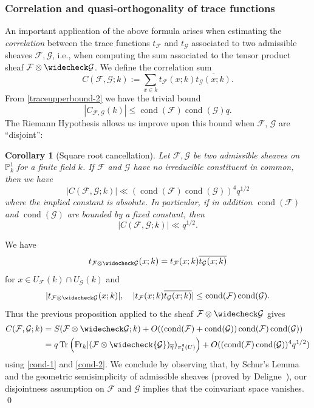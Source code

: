 \documentclass[12pt,a4paper,reqno]{amsart}
\numberwithin{equation}{section}
\DeclareMathOperator*\cond{cond}
\theoremstyle{plain}
\newtheorem{corollary}[theorem]{Corollary}
\theoremstyle{definition}
\newcommand\Fr{\mathrm{Fr}}
\newcommand\ov{\overline}
\newcommand\wcheck{\widecheck}
\newcommand\mcF{\mathcal{F}}
\newcommand\mcG{\mathcal{G}}
\newcommand\Pl{\mathbb{P}^1}
\DeclareMathOperator{\Tr}{Tr}
\begin{document}
\subsubsection{Correlation and quasi-orthogonality of trace functions}
An important application of the above formula arises when estimating
the \emph{correlation} between the trace functions $t_\mcF$ and
$t_\mcG$ associated to two admissible sheaves $\mcF, \mcG$, i.e., when
computing the sum associated to the tensor product sheaf
$\mcF\otimes\wcheck\mcG$.  
We define the correlation sum
$$
C(\mcF,\mcG;k):=\sum_{x\in k}t_\mcF(x;k)\ov{t_\mcG(x;k)}.
$$
From \eqref{traceupperbound-2} we have the trivial bound
$$
|C_{\mcF,\mcG}(k)|\leq \cond(\mcF)\cond(\mcG)q.
$$
The Riemann Hypothesis allows us improve upon this bound when $\mcF$,
$\mcG$ are ``disjoint'':

\begin{corollary}[Square root cancellation]\label{correlationcor} Let
  $\mcF,\mcG$ be two admissible sheaves on $\Pl_k$ for a finite field
  $k$. If $\mcF$ and $\mcG$ have no irreducible constituent in common,
  then we have
$$
|C(\mcF,\mcG;k)| \ll (\cond(\mcF)\cond(\mcG))^4q^{1/2}
$$
where the implied constant is absolute.  In particular, if in addition
$\cond(\mcF)$ and $\cond(\mcG)$ are bounded by a fixed constant, then
$$ 
|C(\mcF, \mcG;k)| \ll q^{1/2}.
$$
\end{corollary}

\proof We have
$$
t_{\mcF\otimes\wcheck\mcG}(x;k)=t_{\mcF}(x;k)\ov{t_{\mcG}(x;k)}
$$
for $x\in U_\mcF(k)\cap U_\mcG(k)$ and
$$
|t_{\mcF\otimes\wcheck\mcG}(x;k)|,\quad
|t_{\mcF}(x;k)\ov{t_{\mcG}(x;k)}|\leq \cond(\mcF)\cond(\mcG).
$$
Thus the previous proposition applied to the sheaf
$\mcF\otimes\widecheck\mcG$ gives
\begin{align*}
  C(\mcF,\mcG;k)&=S(\mcF\otimes\widecheck\mcG;k)+
  O((\cond(\mcF)+\cond(\mcG))\cond(\mcF)\cond(\mcG))\\
  &=q\Tr\left(\Fr_{k}|(\mcF\otimes\wcheck{\mcG})_{\ov\eta})_{\pi_1^g(U)}\right)
  +O((\cond(\mcF)\cond(\mcG))^4q^{1/2})
\end{align*}
using \eqref{cond-1} and \eqref{cond-2}.  We conclude by observing
that, by Schur's Lemma and the geometric semisimplicity of admissible
sheaves (proved by Deligne~\cite[(3.4.1)]{WeilII}), our disjointness
assumption on $\mcF$ and $\mcG$ implies that the coinvariant space
vanishes. \qed
\end{document}

